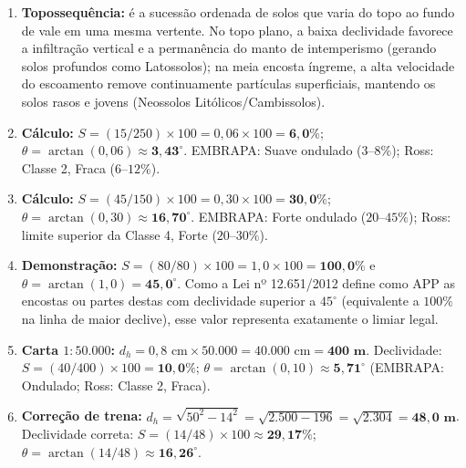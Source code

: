 \begin{boxGabarito}
\begin{enumerate}[leftmargin=1.8em, itemsep=3.5pt]
  \item \textbf{Topossequência:} é a sucessão ordenada de solos que varia do topo ao fundo de vale em uma mesma vertente. No topo plano, a baixa declividade favorece a infiltração vertical e a permanência do manto de intemperismo (gerando solos profundos como Latossolos); na meia encosta íngreme, a alta velocidade do escoamento remove continuamente partículas superficiais, mantendo os solos rasos e jovens (Neossolos Litólicos/Cambissolos).

  \item \textbf{Cálculo:} $S = (15 / 250) \times 100 = 0{,}06 \times 100 = \mathbf{6{,}0\%}$; $\theta = \arctan(0{,}06) \approx \mathbf{3{,}43^\circ}$. EMBRAPA: Suave ondulado ($3\text{--}8\%$); Ross: Classe 2, Fraca ($6\text{--}12\%$).

  \item \textbf{Cálculo:} $S = (45 / 150) \times 100 = 0{,}30 \times 100 = \mathbf{30{,}0\%}$; $\theta = \arctan(0{,}30) \approx \mathbf{16{,}70^\circ}$. EMBRAPA: Forte ondulado ($20\text{--}45\%$); Ross: limite superior da Classe 4, Forte ($20\text{--}30\%$).

  \item \textbf{Demonstração:} $S = (80 / 80) \times 100 = 1{,}0 \times 100 = \mathbf{100{,}0\%}$ e $\theta = \arctan(1{,}0) = \mathbf{45{,}0^\circ}$. Como a Lei nº 12.651/2012 define como APP as encostas ou partes destas com declividade superior a $45^\circ$ (equivalente a $100\%$ na linha de maior declive), esse valor representa exatamente o limiar legal.

  \item \textbf{Carta $1{:}50.000$:} $d_h = 0{,}8\text{ cm} \times 50.000 = 40.000\text{ cm} = \mathbf{400\text{ m}}$. Declividade: $S = (40 / 400) \times 100 = \mathbf{10{,}0\%}$; $\theta = \arctan(0{,}10) \approx \mathbf{5{,}71^\circ}$ (EMBRAPA: Ondulado; Ross: Classe 2, Fraca).

  \item \textbf{Correção de trena:} $d_h = \sqrt{50^2 - 14^2} = \sqrt{2.500 - 196} = \sqrt{2.304} = \mathbf{48{,}0\text{ m}}$. Declividade correta: $S = (14 / 48) \times 100 \approx \mathbf{29{,}17\%}$; $\theta = \arctan(14 / 48) \approx \mathbf{16{,}26^\circ}$.


\end{enumerate}
\end{boxGabarito}
